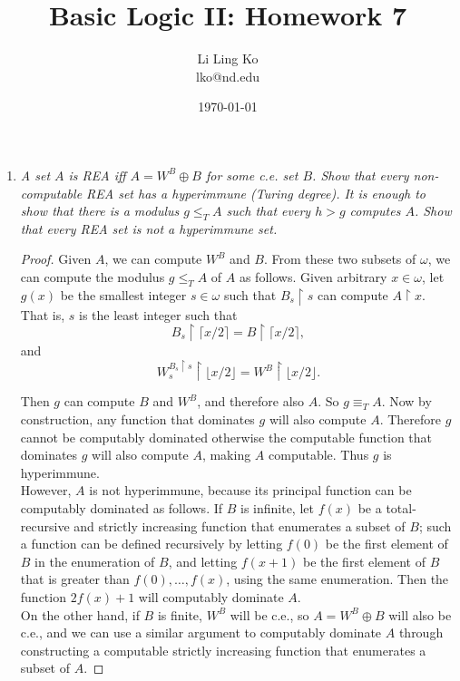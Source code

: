 \documentclass{article}
\begin{document}
\title{Basic Logic II: Homework 7}
\author{Li Ling Ko\\ lko@nd.edu}
\date{\today}
\maketitle

\begin{enumerate}
  \item \it A set $A$ is REA iff $A=W^B\oplus B$ for some c.e. set $B$.
    Show that every non-computable REA set has a hyperimmune (Turing
    degree). It is enough to show that there is a modulus $g\leq_TA$ such
    that every $h>g$ computes $A$. Show that every REA set is not a
    hyperimmune set.

    \begin{proof}
      Given $A$, we can compute $W^B$ and $B$. From these two subsets of
      $\omega$, we can compute the modulus $g\leq_T A$ of $A$ as follows.
      Given arbitrary $x\in\omega$, let $g(x)$ be the smallest integer
      $s\in\omega$ such that $B_s\restriction s$ can compute $A\restriction
      x$. That is, $s$ is the least integer such that
      \[B_s\restriction \lceil x/2\rceil =B\restriction \lceil x/2\rceil,\]
      and
      \[W^{B_s\restriction s}_{s} \restriction \lfloor x/2\rfloor
      =W^B \restriction \lfloor x/2\rfloor.\]

      Then $g$ can compute $B$ and $W^B$, and therefore also $A$. So
      $g\equiv_T A$.  Now by construction, any function that dominates $g$
      will also compute $A$. Therefore $g$ cannot be computably dominated
      otherwise the computable function that dominates $g$ will also
      compute $A$, making $A$ computable. Thus $g$ is hyperimmune. \\

      However, $A$ is not hyperimmune, because its principal function can
      be computably dominated as follows. If $B$ is infinite, let $f(x)$ be
      a total-recursive and strictly increasing function that enumerates a
      subset of $B$; such a function can be defined recursively by letting
      $f(0)$ be the first element of $B$ in the enumeration of $B$, and
      letting $f(x+1)$ be the first element of $B$ that is greater than
      $f(0),\ldots,f(x)$, using the same enumeration. Then the function
      $2f(x)+1$ will computably dominate $A$. \\

      On the other hand, if $B$ is finite, $W^B$ will be c.e., so
      $A=W^B\oplus B$ will also be c.e., and we can use a similar argument
      to computably dominate $A$ through constructing a computable strictly
      increasing function that enumerates a subset of $A$. 
    \end{proof}


\end{enumerate}
\end{document}
